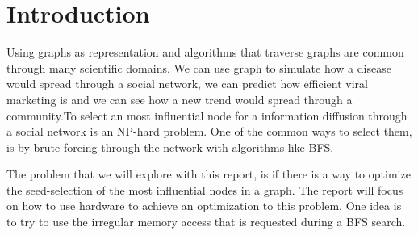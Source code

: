 \chapter{Introduction} 
Using graphs as representation and algorithms that traverse graphs are common through many scientific domains\cite{HybridFPGACPU}. We can use graph to simulate how a disease would spread through a social network, we can predict how efficient viral marketing is and we can see how a new trend would spread through a community\cite{MaxSpread}.To select an most influential node for a information diffusion through a social network is an NP-hard problem\cite{MaxSpread}. One of the common ways to select them, is by brute forcing through the network with algorithms like BFS. 

The problem that we will explore with this report, is if there is a way to optimize the seed-selection of the most influential nodes in a graph. The report will focus on how to use hardware to achieve an optimization to this problem. One idea is to try to use the irregular memory access that is requested during a BFS search.